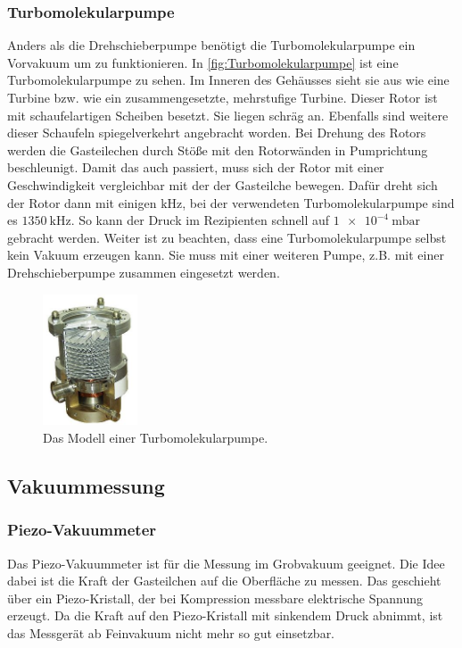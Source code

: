         \subsubsection{Turbomolekularpumpe}
            Anders als die Drehschieberpumpe benötigt die Turbomolekularpumpe ein Vorvakuum um zu funktionieren.
            In \autoref{fig:Turbomolekularpumpe} ist eine Turbomolekularpumpe zu sehen.
            Im Inneren des Gehäusses sieht sie aus wie eine Turbine bzw. wie ein zusammengesetzte, mehrstufige Turbine.
            Dieser Rotor ist mit schaufelartigen Scheiben besetzt.
            Sie liegen schräg an.
            Ebenfalls sind weitere dieser Schaufeln spiegelverkehrt angebracht worden.
            Bei Drehung des Rotors werden die Gasteilechen durch Stöße mit den Rotorwänden in Pumprichtung beschleunigt.
            Damit das auch passiert, muss sich der Rotor mit einer Geschwindigkeit vergleichbar mit der der Gasteilche bewegen.
            Dafür dreht sich der Rotor dann mit einigen $\si{\kilo\hertz}$, bei der verwendeten Turbomolekularpumpe sind es $\SI{1350}{\kilo\hertz}$.
            So kann der Druck im Rezipienten schnell auf $\SI{1e-4}{\milli\bar}$ gebracht werden.
            Weiter ist zu beachten, dass eine Turbomolekularpumpe selbst kein Vakuum erzeugen kann. 
            Sie muss mit einer weiteren Pumpe, z.B. mit einer Drehschieberpumpe zusammen eingesetzt werden.

        \begin{figure}[H]
            \centering
            \includegraphics[width=0.25\textwidth]{bilder/Turbomolekularpumpe}
            \caption{Das Modell einer Turbomolekularpumpe.\cite{turboBild}}
            \label{fig:Turbomolekularpumpe}
        \end{figure}

    \subsection{Vakuummessung}
        \subsubsection{Piezo-Vakuummeter}
            Das Piezo-Vakuummeter ist für die Messung im Grobvakuum geeignet.
            Die Idee dabei ist die Kraft der Gasteilchen auf die Oberfläche zu messen.
            Das geschieht über ein Piezo-Kristall, der bei Kompression messbare elektrische Spannung erzeugt.
            Da die Kraft auf den Piezo-Kristall mit sinkendem Druck abnimmt, ist das Messgerät ab Feinvakuum nicht mehr so gut einsetzbar.

